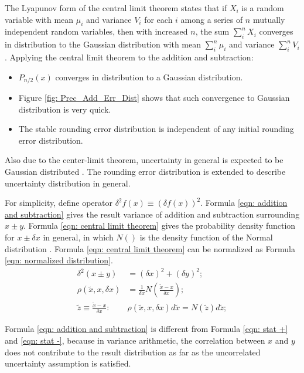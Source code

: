 \documentclass[twoside]{article}
\numberwithin{equation}{section}
\newcommand{\eqspace}{\;\;\;}
\begin{document}
The Lyapunov form of the central limit theorem \cite{Probability_Statistics} states that if $X_i$ is a random variable with mean $\mu_i$ and variance $V_i$ for each $i$ among a series of $n$ mutually independent random variables, then with increased $n$, the sum $\sum\limits_{i}^{n} X_i$ converges in distribution to the Gaussian distribution with mean $\sum\limits_{i}^{n} \mu_i$ and variance $\sum\limits_{i}^{n} V_i$. Applying the central limit theorem to the addition and subtraction: 
\begin{itemize} 
\item $P_{n/2}(x)$ converges in distribution to a Gaussian distribution.

\item Figure \ref{fig: Prec_Add_Err_Dist} shows that such convergence to Gaussian distribution is very quick. 

\item The stable rounding error distribution is independent of any initial rounding error distribution. 
\end{itemize} 

Also due to the center-limit theorem, uncertainty in general is expected to be Gaussian distributed \cite{Statistical_Methods} \cite{Probability_Statistics}. 
The rounding error distribution is extended to describe uncertainty distribution in general.

For simplicity, define operator $\delta^2 f(x) \equiv (\delta f(x))^2$. 
Formula \eqref{eqn: addition and subtraction} gives the result variance of addition and subtraction surrounding $x \pm y$.
Formula \eqref{eqn: central limit theorem} gives the probability density function for $x \pm \delta x$ in general, in which $N()$ is the density function of the  Normal distribution \cite{Probability_Statistics}.
Formula \eqref{eqn: central limit theorem} can be normalized as Formula \eqref{eqn: normalized distribution}.
\begin{align}
\label{eqn: addition and subtraction}
\delta^2 (x \pm y) &= (\delta x)^2 + (\delta y)^2; \\
\label{eqn: central limit theorem}
\rho(\tilde{x}, x, \delta x) & = \frac{1}{\delta x} N(\frac{\tilde{x} - x}{\delta x}); \\
\label{eqn: normalized distribution}
\tilde{z} \equiv \frac{\tilde{x} - x}{\delta x}:\eqspace & \rho(\tilde{x}, x, \delta x) d \tilde{x} = N(\tilde{z}) d \tilde{z};
\end{align}

Formula \eqref{eqn: addition and subtraction} is different from Formula \eqref{eqn: stat +} and \eqref{eqn: stat -}, because in variance arithmetic, the correlation between $x$ and $y$ does not contribute to the result distribution as far as the uncorrelated uncertainty assumption is satisfied.
\end{document}
